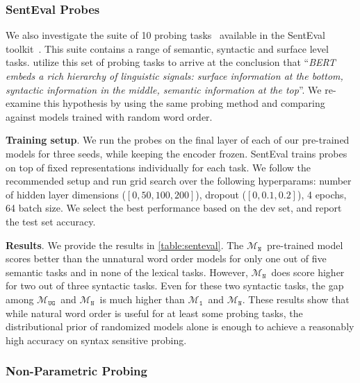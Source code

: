 \documentclass[letterpaper, 12pt]{report}
\newcommand{\xhdr}[1]{{\noindent\bfseries #1}.}
\newcommand{\OR}{$\mathcal{M}_{\texttt{N}}$}
\newcommand{\RI}{$\mathcal{M}_{\texttt{1}}$}
\newcommand{\RC}{$\mathcal{M}_{\texttt{UG}}$}
\begin{document}
\subsubsection{SentEval Probes}

We also investigate the suite of 10 probing tasks~\citep{conneau-etal-2018-cram} available in the SentEval toolkit~\citep{conneau-kiela-2018-senteval}. This suite contains a range of semantic, syntactic and surface level tasks. \citet{jawahar2019a} utilize this set of probing tasks to arrive at the conclusion that %
``\textit{BERT embeds a rich hierarchy of linguistic signals: surface information at the bottom, syntactic information in the middle, semantic information at the top}''. We re-examine this hypothesis by using the same probing method and comparing against models trained with random word order.

\xhdr{Training setup} We run the probes on the final layer of each of our pre-trained models for three seeds, while keeping the encoder frozen. %
SentEval %
trains %
probes on top of fixed representations individually for each task. We follow the recommended setup and run grid search over the following hyperparams: number of hidden layer dimensions ($[0,50,100,200]$), dropout ($[0, 0.1, 0.2]$), 4 epochs, 64 batch size.
We select the best performance based on the dev set, and report the test set accuracy.

\xhdr{Results} We provide the results in \autoref{table:senteval}. The \OR\ pre-trained model scores better than the unnatural word order models for only one out of five semantic tasks and in none of the lexical tasks. However, \OR\ does score higher for two out of three syntactic tasks. Even for these two syntactic tasks, the gap among \RC\ and \OR\ is much higher than \RI\ and \OR. These results show that while natural word order is useful for at least some probing tasks, the distributional prior of randomized models alone is enough to achieve a reasonably high accuracy on syntax sensitive probing.

\subsubsection{Non-Parametric Probing}
\label{sec:non_param_probe}
\end{document}

